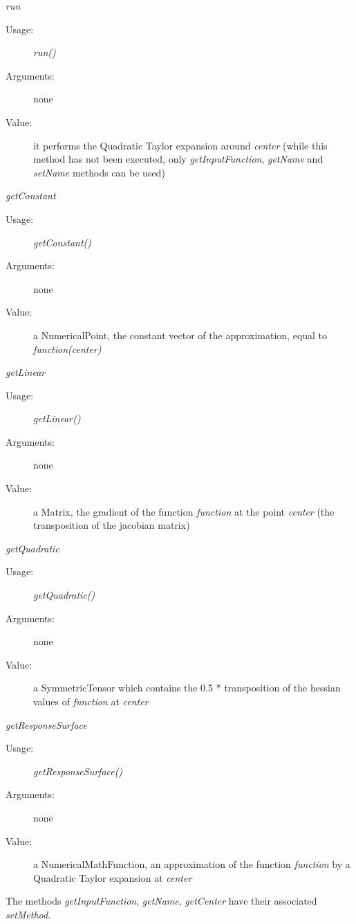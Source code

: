 \begin{description}
\begin{description}
\item \textit{run}
\begin{description}
\item[Usage:] \textit{run()}
\item[Arguments:] none
\item[Value:] it performs the Quadratic Taylor expansion around \textit{center}
(while this method has not been executed, only
\textit{getInputFunction}, \textit{getName} and \textit{setName} methods can be used)
\end{description}
\bigskip

\item \textit{getConstant}
\begin{description}
\item[Usage:] \textit{getConstant()}
\item[Arguments:] none
\item[Value:] a NumericalPoint, the constant vector of the approximation, equal to \textit{function(center)}
\end{description}
\bigskip

\item \textit{getLinear}
\begin{description}
\item[Usage:] \textit{getLinear()}
\item[Arguments:] none
\item[Value:] a Matrix, the gradient of the function \textit{function} at the point \textit{center} (the transposition of the jacobian matrix)
\end{description}
\bigskip

\item \textit{getQuadratic}
\begin{description}
\item[Usage:] \textit{getQuadratic()}
\item[Arguments:] none
\item[Value:] a SymmetricTensor which contains the 0.5 *  transposition of the hessian values of \textit{function} at \textit{center}
\end{description}
\bigskip

\item \textit{getResponseSurface}
\begin{description}
\item[Usage:] \textit{getResponseSurface()}
\item[Arguments:] none
\item[Value:] a NumericalMathFunction, an approximation of the function \textit{function} by a Quadratic Taylor expansion at  \textit{center}
\end{description}
\end{description}

\item[Links:] \rule{0pt}{1em}

The methods \textit{getInputFunction}, \textit{getName}, \textit{getCenter} have their associated \textit{setMethod}.

\end{description}
